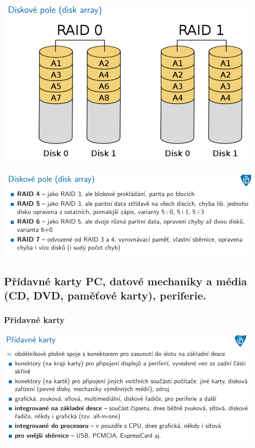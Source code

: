 \documentclass[10pt,a4paper]{article}
\begin{document}
\includegraphics[scale=0.65]{img/prvni_odstavec/otazka6/disk6.png}

\includegraphics[scale=0.65]{img/prvni_odstavec/otazka6/disk7.png}



\clearpage
\subsection{Přídavné karty PC, datové mechaniky a média (CD, DVD, paměťové karty), periferie.}

\subsubsection{Přídavné karty}
\includegraphics[scale=0.65]{img/prvni_odstavec/otazka7/karty1.png}
\end{document}
